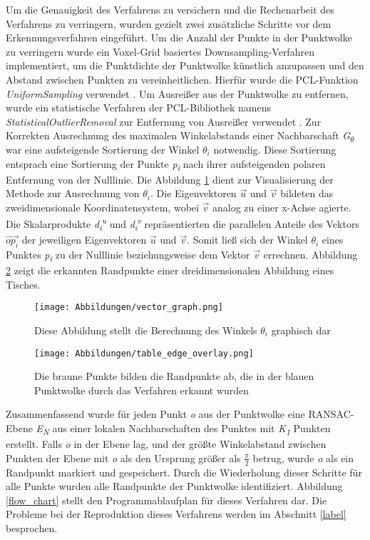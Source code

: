 Um die Genauigkeit des Verfahrens zu versichern und die Rechenarbeit des Verfahrens zu verringern, wurden gezielt zwei zusätzliche Schritte vor dem Erkennungsverfahren eingeführt. Um die Anzahl der Punkte in der Punktwolke zu verringern wurde ein Voxel-Grid basiertes Downsampling-Verfahren implementiert, um die Punktdichte der Punktwolke künstlich anzupassen und den Abstand zwischen Punkten zu vereinheitlichen. Hierfür wurde die PCL-Funktion \textit{UniformSampling} verwendet \autocite{noauthor_point_2023}. Um Ausreißer aus der Punktwolke zu entfernen, wurde ein statistische Verfahren der PCL-Bibliothek namens \textit{StatisticalOutlierRemoval} zur Entfernung von Ausreißer verwendet \autocite{rusu_towards_2008}. Zur Korrekten Ausrechnung des maximalen Winkelabstands einer Nachbarschaft \textit{G\textsubscript{$\theta$}} war eine aufsteigende Sortierung der Winkel \textit{$\theta_i$} notwendig. Diese Sortierung entsprach eine Sortierung der Punkte \textit{p\textsubscript{i}} nach ihrer aufsteigenden polaren Entfernung von der Nulllinie. Die Abbildung \ref{vector_graph} dient zur Visualisierung der Methode zur Ausrechnung von $\theta_i$. Die Eigenvektoren $\vec{u}$ und $\vec{v}$ bildeten das zweidimensionale Koordinatensystem, wobei $\vec{v}$ analog zu einer x-Achse agierte. Die Skalarprodukte \textit{d\textsubscript{i}\textsuperscript{u}} und \textit{d\textsubscript{i}\textsuperscript{v}} repräsentierten die parallelen Anteile des Vektors $\vec{{op}_i}$ der jeweiligen Eigenvektoren $\vec{u}$ und $\vec{v}$. Somit ließ sich der Winkel $\theta_i$ eines Punktes \textit{p\textsubscript{i}} zu der Nulllinie beziehungsweise dem Vektor $\vec{v}$ errechnen. Abbildung \ref{edge_points_table} zeigt die erkannten Randpunkte einer dreidimensionalen Abbildung eines Tisches.

\begin{figure}[t]
	\texttt{[image: Abbildungen/vector\_graph.png]}
	\centering
	\caption{Diese Abbildung stellt die Berechnung des Winkels $\theta_i$ graphisch dar}
	\label{vector_graph}
\end{figure}

\begin{figure}[h]
	\texttt{[image: Abbildungen/table\_edge\_overlay.png]}
	\centering
	\caption{Die braune Punkte bilden die Randpunkte ab, die in der blauen Punktwolke durch das Verfahren erkannt wurden}
	\label{edge_points_table}
\end{figure}

Zusammenfassend wurde für jeden Punkt \textit{o} aus der Punktwolke eine RANSAC-Ebene \textit{E\textsubscript{N}} aus einer lokalen Nachbarschaften des Punktes mit \textit{K\textsubscript{1}} Punkten erstellt. Falls \textit{o} in der Ebene lag, und der größte Winkelabstand zwischen Punkten der Ebene mit \textit{o} als den Ursprung größer als $\frac{\pi}{2}$ betrug, wurde \textit{o} als ein Randpunkt markiert und gespeichert. Durch die Wiederholung dieser Schritte für alle Punkte wurden alle Randpunkte der Punktwolke identifiziert. Abbildung \ref{flow_chart} stellt den Programmablaufplan für dieses Verfahren dar. Die Probleme bei der Reproduktion dieses Verfahrens werden im Abschnitt \ref{label} besprochen.

